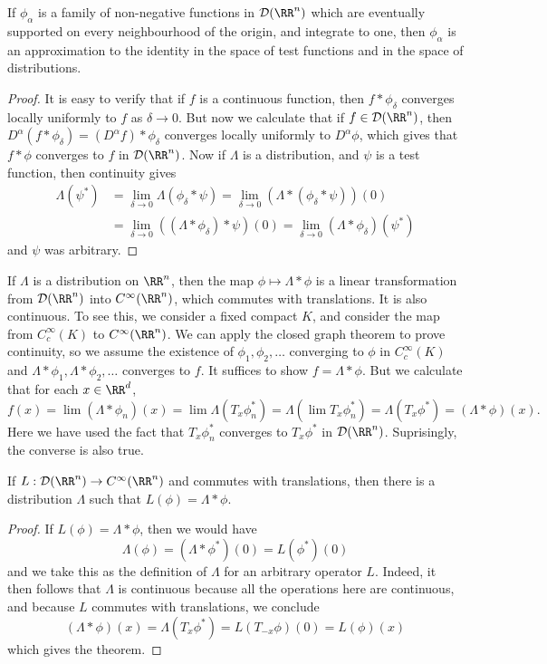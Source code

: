 \begin{theorem}
    If $\phi_\alpha$ is a family of non-negative functions in $\mathcal{D}(\RR^n)$ which are eventually supported on every neighbourhood of the origin, and integrate to one, then $\phi_\alpha$ is an approximation to the identity in the space of test functions and in the space of distributions.
\end{theorem}
\begin{proof}
    It is easy to verify that if $f$ is a continuous function, then $f * \phi_\delta$ converges locally uniformly to $f$ as $\delta \to 0$. But now we calculate that if $f \in \mathcal{D}(\RR^n)$, then $D^\alpha(f * \phi_\delta) = (D^\alpha f) * \phi_\delta$ converges locally uniformly to $D^\alpha \phi$, which gives that $f * \phi$ converges to $f$ in $\mathcal{D}(\RR^n)$. Now if $\Lambda$ is a distribution, and $\psi$ is a test function, then continuity gives
    \begin{align*}
        \Lambda(\psi^*) &= \lim_{\delta \to 0} \Lambda(\phi_\delta * \psi) = \lim_{\delta \to 0} (\Lambda * (\phi_\delta * \psi))(0)\\
        &= \lim_{\delta \to 0} ((\Lambda * \phi_\delta) * \psi)(0) = \lim_{\delta \to 0} (\Lambda * \phi_\delta)(\psi^*)
    \end{align*}
    and $\psi$ was arbitrary.
\end{proof}

If $\Lambda$ is a distribution on $\RR^n$, then the map $\phi \mapsto \Lambda * \phi$ is a linear transformation from $\mathcal{D}(\RR^n)$ into $C^\infty(\RR^n)$, which commutes with translations. It is also continuous. To see this, we consider a fixed compact $K$, and consider the map from $C_c^\infty(K)$ to $C^\infty(\RR^n)$. We can apply the closed graph theorem to prove continuity, so we assume the existence of $\phi_1, \phi_2, \dots$ converging to $\phi$ in $C_c^\infty(K)$ and $\Lambda * \phi_1, \Lambda * \phi_2, \dots$ converges to $f$. It suffices to show $f = \Lambda * \phi$. But we calculate that for each $x \in \RR^d$,
%
\[ f(x) = \lim (\Lambda * \phi_n)(x) = \lim \Lambda(T_x \phi^*_n) = \Lambda (\lim T_x \phi^*_n) = \Lambda(T_x \phi^*) = (\Lambda * \phi)(x). \]
%
Here we have used the fact that $T_x \phi_n^*$ converges to $T_x \phi^*$ in $\mathcal{D}(\RR^n)$. Suprisingly, the converse is also true.

\begin{theorem}
    If $L: \mathcal{D}(\RR^n) \to C^\infty(\RR^n)$ and commutes with translations, then there is a distribution $\Lambda$ such that $L(\phi) = \Lambda * \phi$.
\end{theorem}
\begin{proof}
    If $L(\phi) = \Lambda * \phi$, then we would have
    \[ \Lambda(\phi) = (\Lambda * \phi^*)(0) = L(\phi^*)(0) \]
    and we take this as the definition of $\Lambda$ for an arbitrary operator $L$. Indeed, it then follows that $\Lambda$ is continuous because all the operations here are continuous, and because $L$ commutes with translations, we conclude
    \[ (\Lambda * \phi)(x) = \Lambda(T_x \phi^*) = L(T_{-x} \phi)(0) = L(\phi)(x) \]
    which gives the theorem.
\end{proof}

